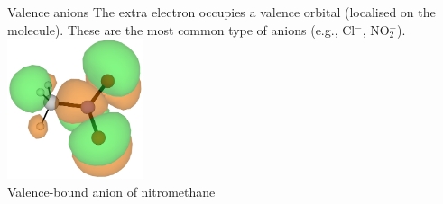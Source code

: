 \documentclass[9pt,t,xcolor=table]{beamer}
\begin{document}

\begin{frame}{\huge Valence anions}\large
    \vspace{5pt}
    The extra electron occupies a valence orbital (localised on the molecule).
    These are the most common type of anions (e.g., Cl$^-$, NO$_2^-$).
    \vfill
    \centering
    \includegraphics[width=0.3\textwidth]{Figs/MeNO2_VBS.png}\\
	\vspace{10pt}
	\small Valence-bound anion of nitromethane
\end{frame}
\end{document}
